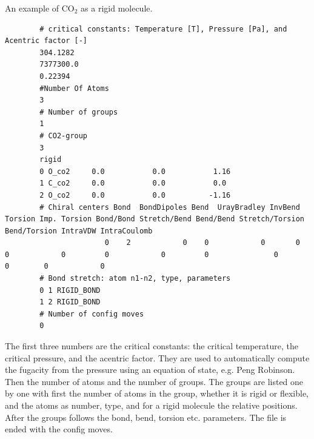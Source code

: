 An example of CO$_2$ as a rigid molecule.
\begin{tiny}
\begin{verbatim}
        # critical constants: Temperature [T], Pressure [Pa], and Acentric factor [-]
        304.1282
        7377300.0
        0.22394
        #Number Of Atoms
        3
        # Number of groups
        1
        # CO2-group
        3
        rigid
        0 O_co2     0.0           0.0           1.16
        1 C_co2     0.0           0.0           0.0
        2 O_co2     0.0           0.0          -1.16
        # Chiral centers Bond  BondDipoles Bend  UrayBradley InvBend  Torsion Imp. Torsion Bond/Bond Stretch/Bend Bend/Bend Stretch/Torsion Bend/Torsion IntraVDW IntraCoulomb
                       0    2            0    0            0       0        0            0         0            0         0               0            0        0            0
        # Bond stretch: atom n1-n2, type, parameters
        0 1 RIGID_BOND
        1 2 RIGID_BOND
        # Number of config moves
        0
\end{verbatim}
\end{tiny}
The first three numbers are the critical constants: the critical temperature, the critical pressure, and the acentric factor.
They are used to automatically compute the fugacity from the pressure using an equation of state, e.g. Peng Robinson.
Then the number of atoms and the number of groups. The groups are listed one by one with first the number of atoms in the group,
whether it is rigid or flexible, and the atoms as number, type, and for a rigid molecule the relative positions.
After the groups follows the bond, bend, torsion etc. parameters. The file is ended with the config moves.
